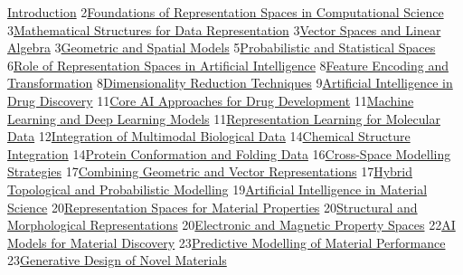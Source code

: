 \documentclass[
]{article}
\begin{document}
\protect\hyperlink{introduction}{Introduction}
2\protect\hyperlink{foundations-of-representation-spaces-in-computational-sci--ence}{Foundations
of Representation Spaces in Computational Science}
3\protect\hyperlink{mathematical-structures-for-data-representation}{Mathematical
Structures for Data Representation}
3\protect\hyperlink{vector-spaces-and-linear-algebra}{Vector Spaces and
Linear Algebra}
3\protect\hyperlink{geometric-and-spatial-models}{Geometric and Spatial
Models}
5\protect\hyperlink{probabilistic-and-statistical-spaces}{Probabilistic
and Statistical Spaces}
6\protect\hyperlink{role-of-representation-spaces-in-artificial-intelligence}{Role
of Representation Spaces in Artificial Intelligence}
8\protect\hyperlink{feature-encoding-and-transformation}{Feature
Encoding and Transformation}
8\protect\hyperlink{dimensionality-reduction-techniques}{Dimensionality
Reduction Techniques}
9\protect\hyperlink{artificial-intelligence-in-drug-discovery}{Artificial
Intelligence in Drug Discovery}
11\protect\hyperlink{core-ai-approaches-for-drug-development}{Core AI
Approaches for Drug Development}
11\protect\hyperlink{machine-learning-and-deep-learning-models}{Machine
Learning and Deep Learning Models}
11\protect\hyperlink{representation-learning-for-molecular-data}{Representation
Learning for Molecular Data}
12\protect\hyperlink{integration-of-multimodal-biological-data}{Integration
of Multimodal Biological Data}
14\protect\hyperlink{chemical-structure-integration}{Chemical Structure
Integration}
14\protect\hyperlink{protein-conformation-and-folding-data}{Protein
Conformation and Folding Data}
16\protect\hyperlink{cross-space-modelling-strategies}{Cross-Space
Modelling Strategies}
17\protect\hyperlink{combining-geometric-and-vector-representations}{Combining
Geometric and Vector Representations}
17\protect\hyperlink{hybrid-topological-and-probabilistic-modelling}{Hybrid
Topological and Probabilistic Modelling}
19\protect\hyperlink{artificial-intelligence-in-material-science}{Artificial
Intelligence in Material Science}
20\protect\hyperlink{representation-spaces-for-material-properties}{Representation
Spaces for Material Properties}
20\protect\hyperlink{structural-and-morphological-representations}{Structural
and Morphological Representations}
20\protect\hyperlink{electronic-and-magnetic-property-spaces}{Electronic
and Magnetic Property Spaces}
22\protect\hyperlink{ai-models-for-material-discovery}{AI Models for
Material Discovery}
23\protect\hyperlink{predictive-modelling-of-material-performance}{Predictive
Modelling of Material Performance}
23\protect\hyperlink{generative-design-of-novel-materials}{Generative
Design of Novel Materials}
\end{document}
